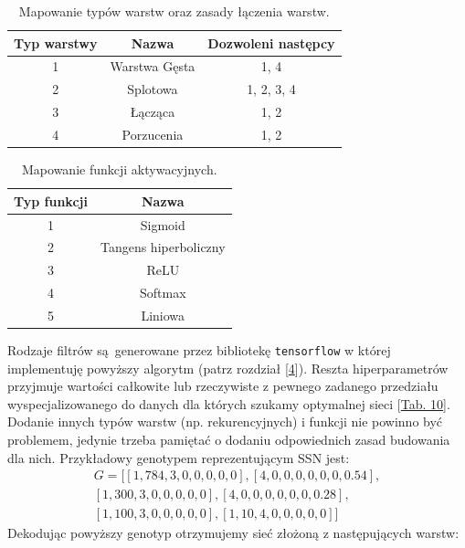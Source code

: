 \documentclass{article}
\begin{document}
\begin{table}[H]
\centering
\begin{tabular}{|c|c|c|}
	\hline
	Typ warstwy & Nazwa & Dozwoleni następcy \\
	\hline
	1 & Warstwa Gęsta & 1, 4\\
	2 & Splotowa & 1, 2, 3, 4\\
	3 & Łącząca & 1, 2\\
	4 & Porzucenia & 1, 2 \\
	\hline
\end{tabular}
\caption{\label{tab:rules}Mapowanie typów warstw oraz zasady łączenia warstw.}
\end{table}
\begin{table}[H]
\centering
\begin{tabular}{|c|c|}
	\hline
	Typ funkcji & Nazwa\\
	\hline
	1 & Sigmoid \\
	2 & Tangens hiperboliczny \\
	3 & ReLU \\
	4 & Softmax \\
	5 & Liniowa \\
	\hline
\end{tabular}
\caption{\label{tab:fun}Mapowanie funkcji aktywacyjnych.}
\end{table}
Rodzaje filtrów są generowane przez bibliotekę \texttt{tensorflow} w której implementuję 
powyższy algorytm (patrz rozdział [\hyperref[sec:imp]{4}]).
Reszta hiperparametrów przyjmuje wartości całkowite lub rzeczywiste
z pewnego zadanego przedziału wyspecjalizowanego do danych dla których szukamy optymalnej
sieci [\hyperref[tab:fm_zakres]{Tab. 10}].\\
Dodanie innych typów warstw (np. rekurencyjnych) i funkcji nie powinno być problemem, jedynie
trzeba pamiętać o dodaniu odpowiednich zasad budowania dla nich.
Przykładowy genotypem reprezentującym SSN jest:\\
\begin{align*}
	  G = \big[[1, 784, 3, 0, 0, 0, 0, 0], [4, 0, 0, 0, 0, 0, 0, 0.54],\\
	          [1, 300, 3, 0, 0, 0, 0, 0], [4, 0, 0, 0, 0, 0, 0, 0.28],\\ 
	          [1, 100, 3, 0, 0, 0, 0, 0], [1, 10, 4, 0, 0, 0, 0, 0]\big]
\end{align*}
Dekodując powyższy genotyp otrzymujemy sieć złożoną z następujących warstw:\\
\end{document}
